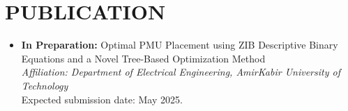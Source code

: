 \documentclass[11pt,a4paper,sans]{moderncv} %
\begin{document}






\section{PUBLICATION}
\begin{itemize}
    \item \textbf{In Preparation:} Optimal PMU Placement using ZIB Descriptive Binary Equations and a Novel Tree-Based Optimization Method \\
    \emph{Affiliation: Department of Electrical Engineering, AmirKabir University of Technology} \\
    Expected submission date: May 2025.
\end{itemize}

\end{document}
